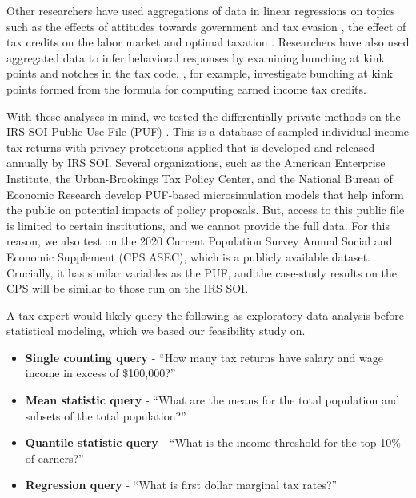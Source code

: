Other researchers have used aggregations of data in linear regressions on topics such as the effects of attitudes towards government and tax evasion \autocite{cullen2021political}, the effect of tax credits on the labor market \autocite{tong2014impact} and optimal taxation \autocite{piketty2014optimal}. Researchers have also used aggregated data to infer behavioral responses by examining bunching at kink points \autocite{chetty2011adjustment} and notches \autocite{kleven2013using} in the tax code. \cite{mortenson2020bunching}, for example, investigate bunching at kink points formed from the formula for computing earned income tax credits.

With these analyses in mind, we tested the differentially private methods on the IRS SOI Public Use File (PUF) \autocite{barrientos2021}. This is a database of sampled individual income tax returns with privacy-protections applied that is developed and released annually by IRS SOI. Several organizations, such as the American Enterprise Institute, the Urban-Brookings Tax Policy Center, and the National Bureau of Economic Research develop PUF-based microsimulation models that help inform the public on potential impacts of policy proposals. But, access to this public file is limited to certain institutions, and we cannot provide the full data. For this reason, we also test on the 2020 Current Population Survey Annual Social and Economic Supplement (CPS ASEC), which is a publicly available dataset. Crucially, it has similar variables as the PUF, and the case-study results on the CPS will be similar to those run on the IRS SOI.

A tax expert would likely query the following as exploratory data analysis before statistical modeling, which we based our feasibility study on.

\begin{itemize}
    \item \textbf{Single counting query} - ``How many tax returns have salary and wage income in excess of \$100,000?''
    \item \textbf{Mean statistic query} - ``What are the means for the total population and subsets of the total population?''
    \item \textbf{Quantile statistic query} - ``What is the income threshold for the top 10\% of earners?''
    \item \textbf{Regression query} - ``What is first dollar marginal tax rates?''
\end{itemize}

